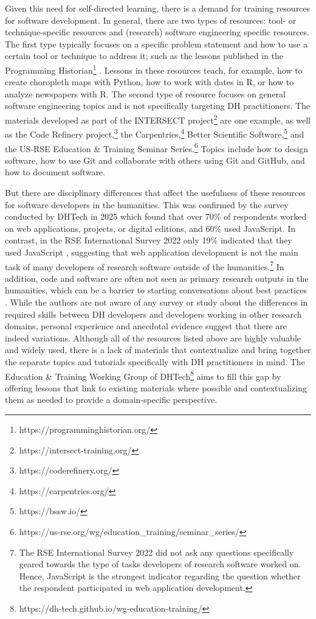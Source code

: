 \documentclass[final]{anthology-ch} %
\begin{document}
Given this need for self-directed learning, there is a demand for training resources for software development. In general, there are two types of resources: tool- or technique-specific resources and (research) software engineering specific resources. The first type typically focuses on a specific problem statement and how to use a certain tool or technique to address it; such as the  lessons published in the Programming Historian\footnote{https://programminghistorian.org/
} \cite{mullen2025, ryan2021}. Lessons in these resources teach, for example, how to create choropleth maps with Python, how to work with dates in R, or how to analyze newspapers with R. The second type of resource focuses on general software engineering topics and is not specifically targeting DH practitioners. The materials developed as part of the INTERSECT project\footnote{https://intersect-training.org/
} are one example, as well as the Code Refinery project,\footnote{https://coderefinery.org/} the Carpentries,\footnote{https://carpentries.org/} Better Scientific Software,\footnote{https://bssw.io/
} and the US-RSE Education \& Training Seminar Series.\footnote{https://us-rse.org/wg/education\_training/seminar\_series/
} Topics include how to design software, how to use Git and collaborate with others using Git and GitHub, and how to document software.

But there are disciplinary differences that affect the usefulness of these resources for software developers in the humanities. This was confirmed by the survey conducted by DHTech in 2025 which found that over 70\% of respondents worked on web applications, projects, or digital editions, and 60\% used JavaScript. In contrast, in the RSE International Survey 2022 only 19\% indicated that they used JavaScript \cite{hettrick2022}, suggesting that web application development is not the main task of many developers of research software outside of the humanities.\footnote{The RSE International Survey 2022 did not ask any questions specifically geared towards the type of tasks developers of research software worked on. Hence, JavaScript is the strongest indicator regarding the question whether the respondent participated in web application development.
} In addition, code and software are often not seen as primary research outputs in the humanities, which can be a barrier to starting conversations about best practices \cite{vanzundert2020}. While the authors are not aware of any survey or study about the differences in required skills between DH developers and developers working in other research domains, personal experience and anecdotal evidence suggest that there are indeed variations. Although all of the resources listed above are highly valuable and widely used, there is a lack of materials that contextualize and bring together the separate topics and tutorials specifically with DH practitioners in mind. The Education \& Training Working Group of DHTech\footnote{https://dh-tech.github.io/wg-education-training/} aims to fill this gap by offering lessons that link to existing materials where possible and contextualizing them as needed to provide a domain-specific perspective.
\end{document}
